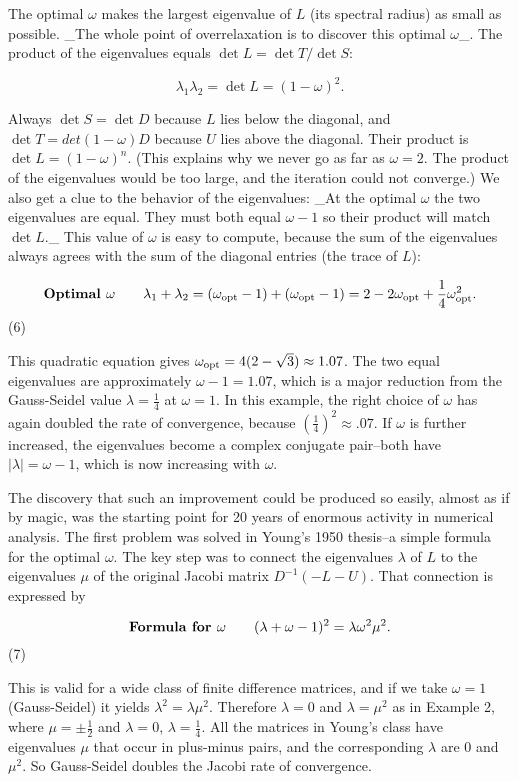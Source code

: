 The optimal \(\omega\) makes the largest eigenvalue of \(L\) (its spectral radius) as small as possible. _The whole point of overrelaxation is to discover this optimal \(\omega\)_. The product of the eigenvalues equals \(\det L=\det T/\det S\):

\[\lambda_{1}\lambda_{2}=\det L=(1-\omega)^{2}.\]

Always \(\det S=\det D\) because \(L\) lies below the diagonal, and \(\det T=det(1-\omega)D\) because \(U\) lies above the diagonal. Their product is \(\det L=(1-\omega)^{n}\). (This explains why we never go as far as \(\omega=2\). The product of the eigenvalues would be too large, and the iteration could not converge.) We also get a clue to the behavior of the eigenvalues: _At the optimal \(\omega\) the two eigenvalues are equal. They must both equal \(\omega-1\) so their product will match \(\det L\)._ This value of \(\omega\) is easy to compute, because the sum of the eigenvalues always agrees with the sum of the diagonal entries (the trace of \(L\)):

\[\mbox{\bf Optimal }\omega\qquad\lambda_{1}+\lambda_{2}=(\omega_{\rm opt}-1)+( \omega_{\rm opt}-1)=2-2\omega_{\rm opt}+\frac{1}{4}\omega_{\rm opt}^{2}.\] (6)

This quadratic equation gives \(\omega_{\rm opt}=4(2-\sqrt{3})\approx 1.07\). The two equal eigenvalues are approximately \(\omega-1=1.07\), which is a major reduction from the Gauss-Seidel value \(\lambda=\frac{1}{4}\) at \(\omega=1\). In this example, the right choice of \(\omega\) has again doubled the rate of convergence, because \((\frac{1}{4})^{2}\approx.07\). If \(\omega\) is further increased, the eigenvalues become a complex conjugate pair--both have \(|\lambda|=\omega-1\), which is now increasing with \(\omega\).

The discovery that such an improvement could be produced so easily, almost as if by magic, was the starting point for 20 years of enormous activity in numerical analysis. The first problem was solved in Young's 1950 thesis--a simple formula for the optimal \(\omega\). The key step was to connect the eigenvalues \(\lambda\) of \(L\) to the eigenvalues \(\mu\) of the original Jacobi matrix \(D^{-1}(-L-U)\). That connection is expressed by

\[\mbox{\bf Formula for }\omega\qquad(\lambda+\omega-1)^{2}=\lambda\omega^{2} \mu^{2}.\] (7)

This is valid for a wide class of finite difference matrices, and if we take \(\omega=1\) (Gauss-Seidel) it yields \(\lambda^{2}=\lambda\mu^{2}\). Therefore \(\lambda=0\) and \(\lambda=\mu^{2}\) as in Example 2, where \(\mu=\pm\frac{1}{2}\) and \(\lambda=0\), \(\lambda=\frac{1}{4}\). All the matrices in Young's class have eigenvalues \(\mu\) that occur in plus-minus pairs, and the corresponding \(\lambda\) are \(0\) and \(\mu^{2}\). So Gauss-Seidel doubles the Jacobi rate of convergence.

